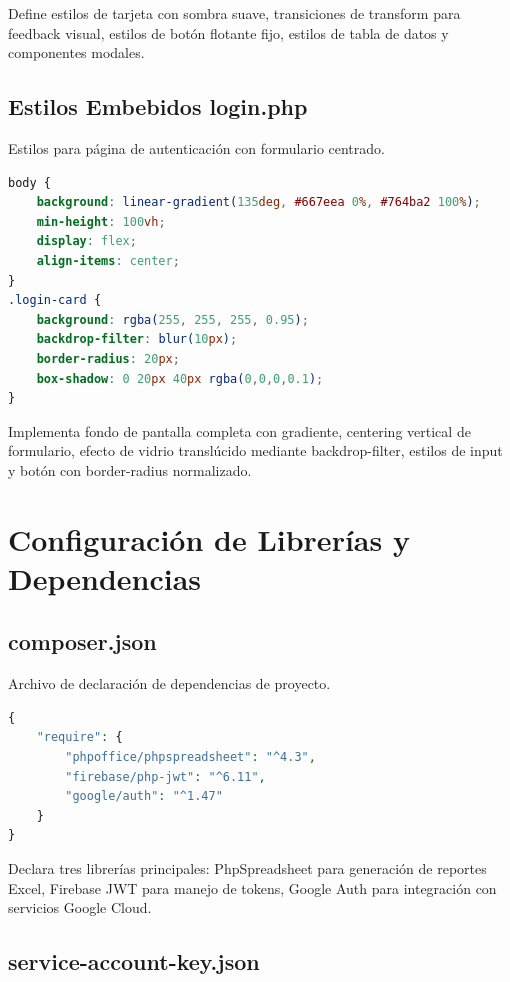 \documentclass[12pt,a4paper]{article}
\begin{document}
Define estilos de tarjeta con sombra suave, transiciones de transform para feedback visual, estilos de botón flotante fijo, estilos de tabla de datos y componentes modales.

\subsection{Estilos Embebidos login.php}

Estilos para página de autenticación con formulario centrado.

\begin{lstlisting}[language=CSS,caption={Estilo de card de login}]
body {
    background: linear-gradient(135deg, #667eea 0%, #764ba2 100%);
    min-height: 100vh;
    display: flex;
    align-items: center;
}
.login-card {
    background: rgba(255, 255, 255, 0.95);
    backdrop-filter: blur(10px);
    border-radius: 20px;
    box-shadow: 0 20px 40px rgba(0,0,0,0.1);
}
\end{lstlisting}

Implementa fondo de pantalla completa con gradiente, centering vertical de formulario, efecto de vidrio translúcido mediante backdrop-filter, estilos de input y botón con border-radius normalizado.

\newpage

\section{Configuración de Librerías y Dependencias}

\subsection{composer.json}

Archivo de declaración de dependencias de proyecto.

\begin{lstlisting}[language=PHP,caption={Declaración de dependencias}]
{
    "require": {
        "phpoffice/phpspreadsheet": "^4.3",
        "firebase/php-jwt": "^6.11",
        "google/auth": "^1.47"
    }
}
\end{lstlisting}

Declara tres librerías principales: PhpSpreadsheet para generación de reportes Excel, Firebase JWT para manejo de tokens, Google Auth para integración con servicios Google Cloud.

\subsection{service-account-key.json}
\end{document}
